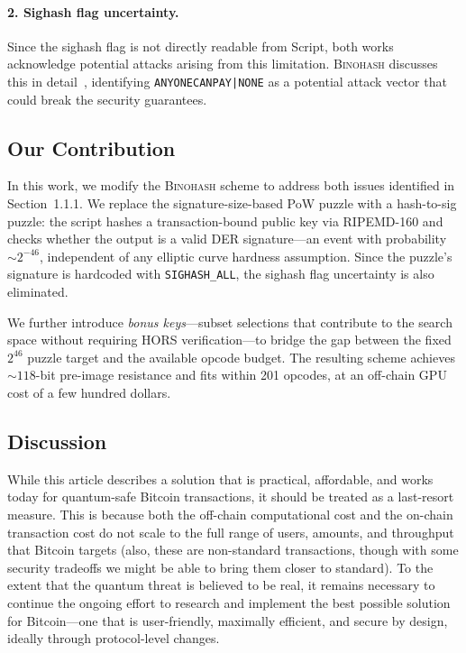 \documentclass[11pt, a4paper]{article}
\begin{document}
\paragraph{2. Sighash flag uncertainty.}
Since the sighash flag is not directly readable from Script, both works acknowledge potential attacks arising from this limitation. \textsc{Binohash} discusses this in detail~\cite[Section~7.1]{linus2024binohash}, identifying \texttt{ANYONECANPAY|NONE} as a potential attack vector that could break the security guarantees.

\subsection{Our Contribution}
\label{sec:contribution}

In this work, we modify the \textsc{Binohash} scheme to address both issues identified in Section~1.1.1. We replace the signature-size-based PoW puzzle with a hash-to-sig puzzle: the script hashes a transaction-bound public key via RIPEMD-160 and checks whether the output is a valid DER signature---an event with probability~${\sim}2^{-46}$, independent of any elliptic curve hardness assumption. Since the puzzle's signature is hardcoded with \texttt{SIGHASH\_ALL}, the sighash flag uncertainty is also eliminated.

We further introduce \emph{bonus keys}---subset selections that contribute to the search space without requiring HORS verification---to bridge the gap between the fixed $2^{46}$ puzzle target and the available opcode budget. The resulting scheme achieves~${\sim}118$-bit pre-image resistance and fits within 201 opcodes, at an off-chain GPU cost of a few hundred dollars.

\subsection{Discussion}

While this article describes a solution that is practical, affordable, and works today for quantum-safe Bitcoin transactions, it should be treated as a last-resort measure. This is because both the off-chain computational cost and the on-chain transaction cost do not scale to the full range of users, amounts, and throughput that Bitcoin targets (also, these are non-standard transactions, though with some security tradeoffs we might be able to bring them closer to standard). To the extent that the quantum threat is believed to be real, it remains necessary to continue the ongoing effort to research and implement the best possible solution for Bitcoin---one that is user-friendly, maximally efficient, and secure by design, ideally through protocol-level changes.
\end{document}
